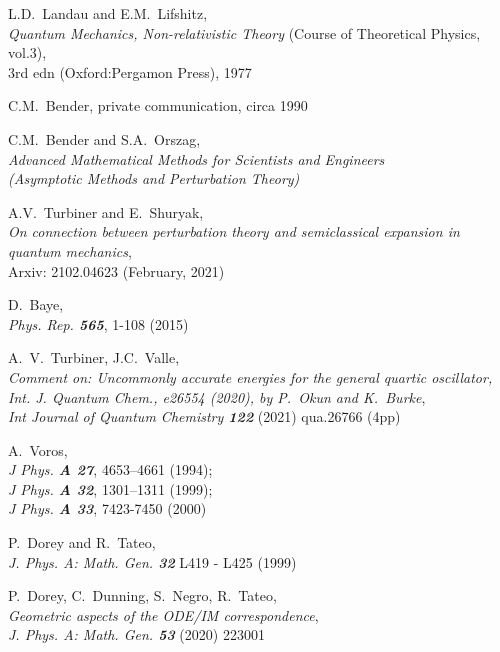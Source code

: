 \documentclass[preprint,preprintnumbers,amsmath,amssymb]{revtex4}
\begin{document}
\begin{thebibliography}{99}

     L.D.~Landau and E.M.~Lifshitz,\\
     {\it Quantum Mechanics, Non-relativistic Theory} {\rm (Course of Theoretical Physics, vol.3)},\\
     {3rd edn (Oxford:Pergamon Press)}, 1977

         C.M.~Bender, private communication, circa 1990

        C.M.~Bender and S.A.~Orszag,\\
        \textit{Advanced Mathematical Methods for Scientists and Engineers\\
        (Asymptotic Methods and Perturbation Theory)}

         A.V.~Turbiner and E.~Shuryak,\\
         \textit{On connection between perturbation theory and semiclassical expansion in quantum mechanics},\\
         Arxiv: 2102.04623 (February, 2021)


         D.~Baye,\\
         {\it Phys. Rep. \bf 565}, 1-108 (2015)

          A.~V.~Turbiner, J.C.~Valle,\\
          \textit{Comment on: \textit{ Uncommonly accurate energies for the general quartic oscillator}, Int. J. Quantum Chem., e26554 (2020), by P.~Okun and K.~Burke},\\
          {\it Int Journal of Quantum Chemistry \bf 122} (2021) qua.26766 (4pp)

          A.~Voros,\\
          {\it J Phys. \bf A 27}, 4653–4661 (1994);\\
          {\it J Phys. \bf A 32}, 1301–1311 (1999);\\
          {\it J Phys. \bf A 33}, 7423-7450 (2000)

           P.~Dorey and R.~Tateo,\\
           {\it J. Phys. A: Math. Gen. \bf 32} L419 - L425 (1999)

           P.~Dorey, C.~Dunning, S.~Negro, R.~Tateo,\\
           \textit{Geometric aspects of the ODE/IM correspondence},\\
           {\it J. Phys. A: Math. Gen. \bf 53} (2020) 223001


\end{thebibliography}
\end{document}
